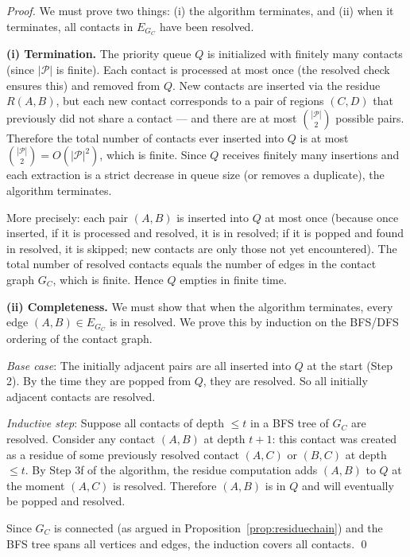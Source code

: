 \documentclass[twocolumn]{article}
\theoremstyle{plain}
\theoremstyle{definition}
\newcommand{\PP}{\mathcal{P}}
\newcommand{\GC}{G_C}
\begin{document}
\begin{proof}
We must prove two things: (i) the algorithm terminates, and (ii) when it
terminates, all contacts in $E_{G_C}$ have been resolved.

\textbf{(i) Termination.} The priority queue $Q$ is initialized with finitely
many contacts (since $|\PP|$ is finite). Each contact is processed at most once
(the resolved check ensures this) and removed from $Q$. New contacts are inserted
via the residue $R(A,B)$, but each new contact corresponds to a pair of regions
$(C,D)$ that previously did not share a contact --- and there are at most
$\binom{|\PP|}{2}$ possible pairs. Therefore the total number of contacts ever
inserted into $Q$ is at most $\binom{|\PP|}{2} = O(|\PP|^2)$, which is finite.
Since $Q$ receives finitely many insertions and each extraction is a strict
decrease in queue size (or removes a duplicate), the algorithm terminates.

More precisely: each pair $(A,B)$ is inserted into $Q$ at most once (because once
inserted, if it is processed and resolved, it is in resolved; if it is popped and
found in resolved, it is skipped; new contacts are only those not yet encountered).
The total number of resolved contacts equals the number of edges in the contact
graph $\GC$, which is finite. Hence $Q$ empties in finite time.

\textbf{(ii) Completeness.} We must show that when the algorithm terminates,
every edge $(A,B) \in E_{G_C}$ is in resolved. We prove this by induction on
the BFS/DFS ordering of the contact graph.

\emph{Base case}: The initially adjacent pairs are all inserted into $Q$ at the
start (Step 2). By the time they are popped from $Q$, they are resolved. So all
initially adjacent contacts are resolved.

\emph{Inductive step}: Suppose all contacts of depth $\leq t$ in a BFS tree of
$\GC$ are resolved. Consider any contact $(A,B)$ at depth $t+1$: this contact
was created as a residue of some previously resolved contact $(A,C)$ or $(B,C)$
at depth $\leq t$. By Step 3f of the algorithm, the residue computation adds
$(A,B)$ to $Q$ at the moment $(A,C)$ is resolved. Therefore $(A,B)$ is in $Q$
and will eventually be popped and resolved.

Since $\GC$ is connected (as argued in Proposition~\ref{prop:residuechain}) and
the BFS tree spans all vertices and edges, the induction covers all contacts. \qed
\end{proof}
\end{document}
